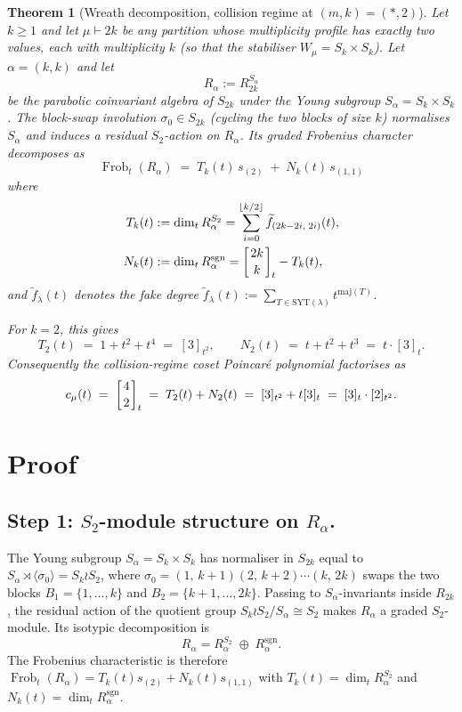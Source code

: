 \documentclass[11pt]{article}
\newtheorem{theorem}{Theorem}
\theoremstyle{remark}
\newcommand{\Frob}{\operatorname{Frob}}
\newcommand{\sgn}{\operatorname{sgn}}
\newcommand{\fdeg}{\widetilde{f}}
\newcommand{\qbinom}[2]{\left[{#1 \atop #2}\right]}
\begin{document}
\begin{theorem}[Wreath decomposition, collision regime at $(m,k)=(*,2)$]
\label{thm:main}
Let $k \geq 1$ and let $\mu \vdash 2k$ be any partition whose multiplicity
profile has exactly two values, each with multiplicity $k$ (so that the
stabiliser $W_\mu = S_k \times S_k$). Let $\alpha = (k, k)$ and let
\[
R_\alpha := R_{2k}^{S_\alpha}
\]
be the parabolic coinvariant algebra of $S_{2k}$ under the Young subgroup
$S_\alpha = S_k \times S_k$. The block-swap involution $\sigma_0 \in S_{2k}$
(cycling the two blocks of size $k$) normalises $S_\alpha$ and induces a
residual $S_2$-action on $R_\alpha$. Its graded Frobenius character
decomposes as
\[
\Frob_t(R_\alpha) \;=\; T_k(t) \, s_{(2)} \;+\; N_k(t) \, s_{(1,1)}
\]
where
\begin{align*}
T_k(t) &:= \dim_t R_\alpha^{S_2} = \sum_{i=0}^{\lfloor k/2 \rfloor}
      \fdeg_{(2k-2i,\;2i)}(t), \\
N_k(t) &:= \dim_t R_\alpha^{\sgn} = \qbinom{2k}{k}_t - T_k(t),
\end{align*}
and $\fdeg_\lambda(t)$ denotes the fake degree
$\fdeg_\lambda(t) := \sum_{T \in \mathrm{SYT}(\lambda)} t^{\mathrm{maj}(T)}$.

For $k = 2$, this gives
\[
T_2(t) \;=\; 1 + t^2 + t^4 \;=\; [3]_{t^2}, \qquad
N_2(t) \;=\; t + t^2 + t^3 \;=\; t \cdot [3]_t.
\]
Consequently the collision-regime coset Poincar\'e polynomial factorises as
\[
c_\mu(t) \;=\; \qbinom{4}{2}_t \;=\; T_2(t) + N_2(t) \;=\; [3]_{t^2} + t[3]_t \;=\; [3]_t \cdot [2]_{t^2}.
\]
\end{theorem}

\section{Proof}

\subsection*{Step 1: $S_2$-module structure on $R_\alpha$.}

The Young subgroup $S_\alpha = S_k \times S_k$ has normaliser in $S_{2k}$
equal to $S_\alpha \rtimes \langle \sigma_0 \rangle = S_k \wr S_2$, where
$\sigma_0 = (1,\,k{+}1)(2,\,k{+}2)\cdots(k,\,2k)$ swaps the two blocks
$B_1 = \{1,\ldots,k\}$ and $B_2 = \{k{+}1,\ldots,2k\}$. Passing to
$S_\alpha$-invariants inside $R_{2k}$, the residual action of the quotient
group $S_k \wr S_2 / S_\alpha \cong S_2$ makes $R_\alpha$ a graded
$S_2$-module. Its isotypic decomposition is
\[
R_\alpha = R_\alpha^{S_2} \;\oplus\; R_\alpha^{\sgn}.
\]
The Frobenius characteristic is therefore
$\Frob_t(R_\alpha) = T_k(t) s_{(2)} + N_k(t) s_{(1,1)}$
with $T_k(t) = \dim_t R_\alpha^{S_2}$ and $N_k(t) = \dim_t R_\alpha^{\sgn}$.
\end{document}

